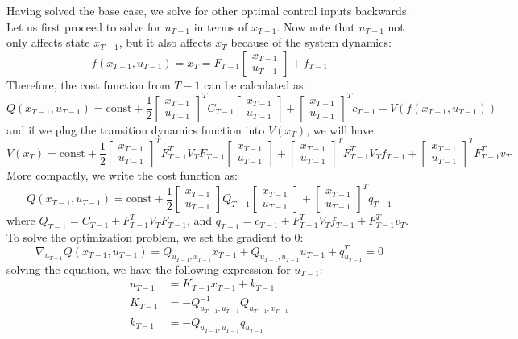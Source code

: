 Having solved the base case, we solve for other optimal control inputs backwards. Let us first proceed to solve for $u_{T-1}$ in terms of $x_{T-1}$. Now note that $u_{T-1}$ not only affects state $x_{T-1}$, but it also affects $x_T$ because of the system dynamics:
\[
f(x_{T-1}, u_{T-1}) = x_T = F_{T-1}\begin{bmatrix}x_{T-1}\\u_{T-1}\end{bmatrix} + f_{T-1}
\]
Therefore, the cost function from $T-1$ can be calculated as:
\[
Q(x_{T-1}, u_{T-1}) = \text{const} + \frac{1}{2}\begin{bmatrix}x_{T-1}\\u_{T-1}\end{bmatrix}^TC_{T-1}\begin{bmatrix}x_{T-1}\\u_{T-1}\end{bmatrix} + \begin{bmatrix}x_{T-1}\\u_{T-1}\end{bmatrix}^Tc_{T-1} + V(f(x_{T-1}, u_{T-1}))
\]
and if we plug the transition dynamics function into $V(x_T)$, we will have:
\[
V(x_T) = \text{const} + \frac{1}{2}\begin{bmatrix}x_{T-1}\\u_{T-1}\end{bmatrix}^TF_{T-1}^TV_TF_{T-1}\begin{bmatrix}x_{T-1}\\u_{T-1}\end{bmatrix} + \begin{bmatrix}x_{T-1}\\u_{T-1}\end{bmatrix}^TF_{T-1}^TV_Tf_{T-1}+\begin{bmatrix}x_{T-1}\\u_{T-1}\end{bmatrix}^TF_{T-1}^Tv_T
\]
More compactly, we write the cost function as:
\[
Q(x_{T-1}, u_{T-1}) = \text{const} +\frac{1}{2} \begin{bmatrix}x_{T-1}\\u_{T-1}\end{bmatrix}Q_{T-1}\begin{bmatrix}x_{T-1}\\u_{T-1}\end{bmatrix} + \begin{bmatrix}x_{T-1}\\u_{T-1}\end{bmatrix}^Tq_{T-1}
\]
where $Q_{T-1} = C_{T-1} + F^T_{T-1}V_TF_{T-1}$, and $q_{T-1} = c_{T-1} +  F^T_{T-1}V_Tf_{T-1} + F^T_{T-1}v_T$. To solve the optimization problem, we set the gradient to 0:
\[
\nabla_{u_{T-1}}Q(x_{T-1}, u_{T-1}) =Q_{u_{T-1},x_{T-1}}x_{T-1} + Q_{u_{T-1},u_{T-1}}u_{T-1}+q_{u_{T-1}}^T=0
\]
solving the equation, we have the following expression for $u_{T-1}$:
\begin{align*}
    u_{T-1} &= K_{T-1}x_{T-1} + k_{T-1}\\
    K_{T-1} &= -Q^{-1}_{u_{T-1},u_{T-1}}Q_{u_{T-1},x_{T-1}}\\
    k_{T-1} &= -Q_{u_{T-1},u_{T-1}}q_{u_{T-1}}
\end{align*}

